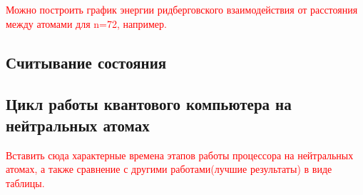 \textcolor{red}{Можно построить график энергии ридберговского взаимодействия от расстояния между атомами для n=72, например.}



\subsection{Считывание состояния}

\subsection{Цикл работы квантового компьютера на нейтральных атомах}

\textcolor{red}{Вставить сюда характерные времена этапов работы процессора на нейтральных атомах, а также сравнение с другими работами(лучшие результаты) в виде таблицы.}

\newpage